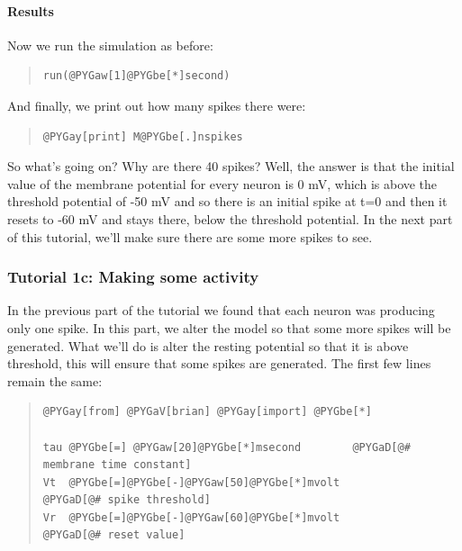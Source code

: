 \documentclass[letterpaper,10pt,english]{manual}
\begin{document}
\paragraph{Results}

Now we run the simulation as before:
\begin{quote}

\begin{Verbatim}[commandchars=@\[\]]
run(@PYGaw[1]@PYGbe[*]second)
\end{Verbatim}
\end{quote}

And finally, we print out how many spikes there were:
\begin{quote}

\begin{Verbatim}[commandchars=@\[\]]
@PYGay[print] M@PYGbe[.]nspikes
\end{Verbatim}
\end{quote}

So what's going on? Why are there 40 spikes? Well, the answer is
that the initial value of the membrane potential for every neuron
is 0 mV, which is above the threshold potential of -50 mV and so there
is an initial spike at t=0 and then it resets to -60 mV and stays there,
below the threshold potential. In the next part of this tutorial, we'll
make sure there are some more spikes to see.

\resetcurrentobjects


\subsubsection{Tutorial 1c: Making some activity}

In the previous part of the tutorial we found that each neuron
was producing only one spike. In this part, we alter the model so
that some more spikes will be generated. What we'll do is alter
the resting potential  so that it is above threshold, this
will ensure that some spikes are generated. The first few
lines remain the same:
\begin{quote}

\begin{Verbatim}[commandchars=@\[\]]
@PYGay[from] @PYGaV[brian] @PYGay[import] @PYGbe[*]

tau @PYGbe[=] @PYGaw[20]@PYGbe[*]msecond        @PYGaD[@# membrane time constant]
Vt  @PYGbe[=]@PYGbe[-]@PYGaw[50]@PYGbe[*]mvolt          @PYGaD[@# spike threshold]
Vr  @PYGbe[=]@PYGbe[-]@PYGaw[60]@PYGbe[*]mvolt          @PYGaD[@# reset value]
\end{Verbatim}
\end{quote}
\end{document}
